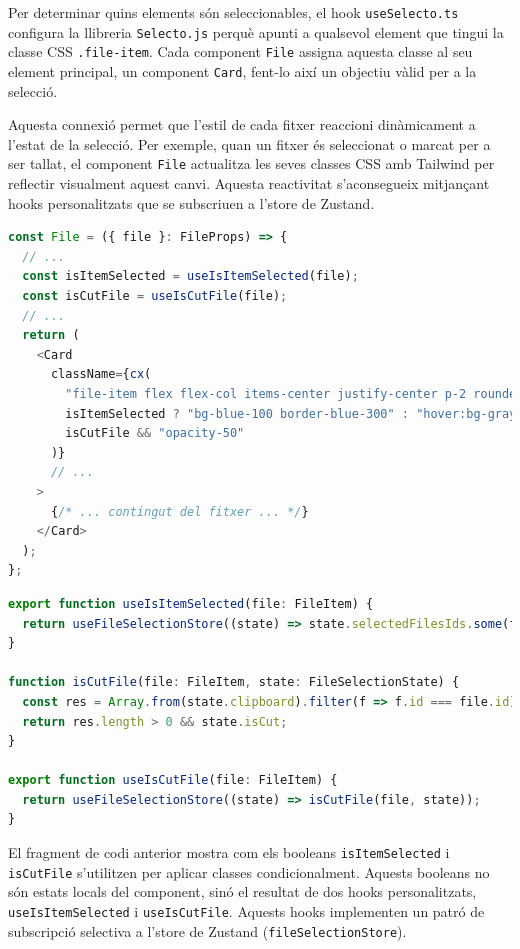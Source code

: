 Per determinar quins elements són seleccionables, el hook \texttt{useSelecto.ts} configura la llibreria \texttt{Selecto.js} perquè apunti a qualsevol element que tingui la classe CSS \texttt{.file-item}. Cada component \texttt{File} assigna aquesta classe al seu element principal, un component \texttt{Card}, fent-lo així un objectiu vàlid per a la selecció.

Aquesta connexió permet que l'estil de cada fitxer reaccioni dinàmicament a l'estat de la selecció. Per exemple, quan un fitxer és seleccionat o marcat per a ser tallat, el component \texttt{File} actualitza les seves classes CSS amb Tailwind per reflectir visualment aquest canvi. Aquesta reactivitat s'aconsegueix mitjançant hooks personalitzats que se subscriuen a l'store de Zustand.

\begin{lstlisting}[language=javascript, caption={Estils dinàmics del component `File` a `index.tsx`}]
const File = ({ file }: FileProps) => {
  // ...
  const isItemSelected = useIsItemSelected(file);
  const isCutFile = useIsCutFile(file);
  // ...
  return (
    <Card
      className={cx(
        "file-item flex flex-col items-center justify-center p-2 rounded-lg cursor-pointer",
        isItemSelected ? "bg-blue-100 border-blue-300" : "hover:bg-gray-100",
        isCutFile && "opacity-50"
      )}
      // ...
    >
      {/* ... contingut del fitxer ... */}
    </Card>
  );
};
\end{lstlisting}

\begin{lstlisting}[language=javascript, caption={Implementació dels hooks `useIsItemSelected` i `useIsCutFile` a `fileSelectionStore.ts`}]
export function useIsItemSelected(file: FileItem) {
  return useFileSelectionStore((state) => state.selectedFilesIds.some(f => f === file.id));
}

function isCutFile(file: FileItem, state: FileSelectionState) {
  const res = Array.from(state.clipboard).filter(f => f.id === file.id);
  return res.length > 0 && state.isCut;
}

export function useIsCutFile(file: FileItem) {
  return useFileSelectionStore((state) => isCutFile(file, state));
}
\end{lstlisting}

El fragment de codi anterior mostra com els booleans \texttt{isItemSelected} i \texttt{isCutFile} s'utilitzen per aplicar classes condicionalment. Aquests booleans no són estats locals del component, sinó el resultat de dos hooks personalitzats, \texttt{useIsItemSelected} i \texttt{useIsCutFile}. Aquests hooks implementen un patró de subscripció selectiva a l'store de Zustand (\texttt{fileSelectionStore}).

